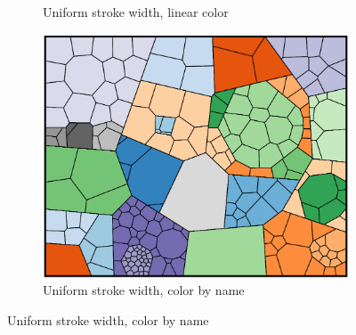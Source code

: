 \documentclass{acm_proc_article-sp} \usepackage{cite}
\begin{document}
\begin{figure}
\begin{subfigure}[b]{\comparelength}
                \caption{Uniform stroke width, linear color}
        \end{subfigure}
        \qquad
        \begin{subfigure}[b]{\comparelength}
                \includegraphics[width=\textwidth]{source-images/compare-nostroke-name-cropped.PNG}
                \caption{Uniform stroke width, color by name}
        \end{subfigure}


\end{figure}
\end{document}
